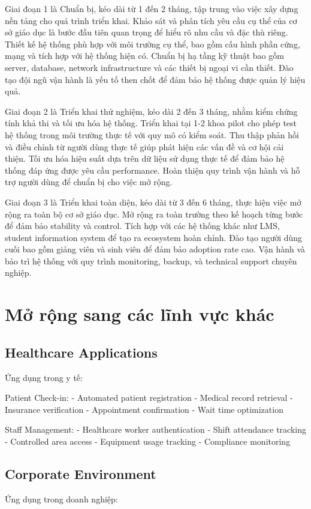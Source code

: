 \documentclass[12pt,a4paper]{report}
\begin{document}
Giai đoạn 1 là Chuẩn bị, kéo dài từ 1 đến 2 tháng, tập trung vào việc xây dựng nền tảng cho quá trình triển khai. Khảo sát và phân tích yêu cầu cụ thể của cơ sở giáo dục là bước đầu tiên quan trọng để hiểu rõ nhu cầu và đặc thù riêng. Thiết kế hệ thống phù hợp với môi trường cụ thể, bao gồm cấu hình phần cứng, mạng và tích hợp với hệ thống hiện có. Chuẩn bị hạ tầng kỹ thuật bao gồm server, database, network infrastructure và các thiết bị ngoại vi cần thiết. Đào tạo đội ngũ vận hành là yếu tố then chốt để đảm bảo hệ thống được quản lý hiệu quả.

Giai đoạn 2 là Triển khai thử nghiệm, kéo dài 2 đến 3 tháng, nhằm kiểm chứng tính khả thi và tối ưu hóa hệ thống. Triển khai tại 1-2 khoa pilot cho phép test hệ thống trong môi trường thực tế với quy mô có kiểm soát. Thu thập phản hồi và điều chỉnh từ người dùng thực tế giúp phát hiện các vấn đề và cơ hội cải thiện. Tối ưu hóa hiệu suất dựa trên dữ liệu sử dụng thực tế để đảm bảo hệ thống đáp ứng được yêu cầu performance. Hoàn thiện quy trình vận hành và hỗ trợ người dùng để chuẩn bị cho việc mở rộng.

Giai đoạn 3 là Triển khai toàn diện, kéo dài từ 3 đến 6 tháng, thực hiện việc mở rộng ra toàn bộ cơ sở giáo dục. Mở rộng ra toàn trường theo kế hoạch từng bước để đảm bảo stability và control. Tích hợp với các hệ thống khác như LMS, student information system để tạo ra ecosystem hoàn chỉnh. Đào tạo người dùng cuối bao gồm giảng viên và sinh viên để đảm bảo adoption rate cao. Vận hành và bảo trì hệ thống với quy trình monitoring, backup, và technical support chuyên nghiệp.

\section{Mở rộng sang các lĩnh vực khác}
\subsection{Healthcare Applications}
Ứng dụng trong y tế:

Patient Check-in:
- Automated patient registration
- Medical record retrieval
- Insurance verification
- Appointment confirmation
- Wait time optimization

Staff Management:
- Healthcare worker authentication
- Shift attendance tracking
- Controlled area access
- Equipment usage tracking
- Compliance monitoring

\subsection{Corporate Environment}
Ứng dụng trong doanh nghiệp:
\end{document}
